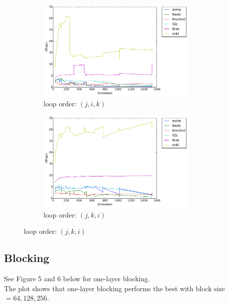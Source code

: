 \documentclass[12pt]{article}
\numberwithin{equation}{section}
\begin{document}
\begin{figure}[!ht]
   \begin{subfigure}
      \centering
        \begin{center}
      \includegraphics[width=0.85\textwidth] {jik}
        \end{center}
      \label{aload0}
      \caption{loop order: $(j, i, k)$}
  \end{subfigure}
  \begin{subfigure}
      \centering
        \begin{center}
      \includegraphics[width=0.85\textwidth] {jki}
        \end{center}
      \label{aload1}
      \caption{loop order: $(j, k, i)$}
  \end{subfigure}

\end{figure}

\subsection{Blocking}

See Figure 5 and 6 below for one-layer blocking.
\\
The plot shows that one-layer blocking performs the best with block size $= 64, 128, 256$.
\end{document}
